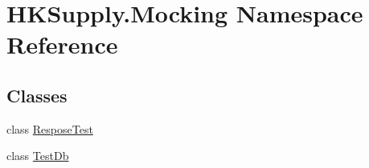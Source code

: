\hypertarget{namespace_h_k_supply_1_1_mocking}{}\section{H\+K\+Supply.\+Mocking Namespace Reference}
\label{namespace_h_k_supply_1_1_mocking}
\subsection*{Classes}
\begin{DoxyCompactItemize}
\item 
class \mbox{\hyperlink{class_h_k_supply_1_1_mocking_1_1_respose_test}{Respose\+Test}}
\item 
class \mbox{\hyperlink{class_h_k_supply_1_1_mocking_1_1_test_db}{Test\+Db}}
\end{DoxyCompactItemize}
